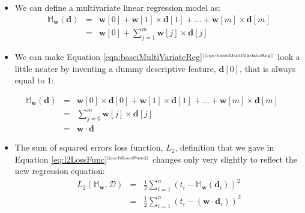 \documentclass[xcolor={table}]{beamer}
\newcommand{\ourEqRef}[1]{\eqref{#1}$^{\text{\tiny[\pageref{#1}]}}$}
\begin{document}
\begin{frame}
\begin{itemize}
\item We can define a multivariate linear regression model as:
\begin{eqnarray}
\mathbb{M}_{\mathbf{w}}(\mathbf{d}) & = & \mathbf{w}[0] + \mathbf{w}[1] \times \mathbf{d}[1] + \dots + \mathbf{w}[m] \times \mathbf{d}[m] \\
& = & \mathbf{w}[0] + \sum_{j=1}^{m} \mathbf{w}[j] \times \mathbf{d}[j] 
\label{eqn:basciMultiVariateReg}
\end{eqnarray}
\end{itemize}
\end{frame} 

\begin{frame}
\begin{itemize}
\item We can make Equation \ourEqRef{eqn:basciMultiVariateReg} look a little neater by inventing a dummy descriptive feature, $\mathbf{d}[0]$, that is always equal to $1$:
\end{itemize}
\begin{eqnarray}
\mathbb{M}_{\mathbf{w}}(\mathbf{d}) & = & \mathbf{w}[0]\times \mathbf{d}[0] + \mathbf{w}[1] \times \mathbf{d}[1] + \ldots + \mathbf{w}[m] \times \mathbf{d}[m] \\
	& = & \sum_{j=0}^{m} \mathbf{w}[j]\times \mathbf{d}[j] \label{eqn:multiVariateRegression1}\\
    & = & \mathbf{w} \cdot \mathbf{d} \label{eqn:multiVariateRegression2}
\end{eqnarray}
\end{frame} 

 \begin{frame} 
 \begin{itemize}
\item The sum of squared errors loss function, $L_2$, definition that we gave in Equation \ourEqRef{eq:l2LossFunc} changes only very slightly to reflect the new regression equation:
\begin{eqnarray}
L_2(\mathbb{M}_{\mathbf{w}},\mathcal{D}) & = & \frac{1}{2}\sum_{i=1}^{n} (t_i - \mathbb{M}_{\mathbf{w}}(\mathbf{d}_i))^2 \\
								  & = &  \frac{1}{2} \sum_{i=1}^{n} (t_i - (\mathbf{w} \cdot \mathbf{d}_i))^2 
\label{eq:l2LossFuncMultiVariate}
\end{eqnarray}
\end{itemize}
\end{frame} 
\end{document}
